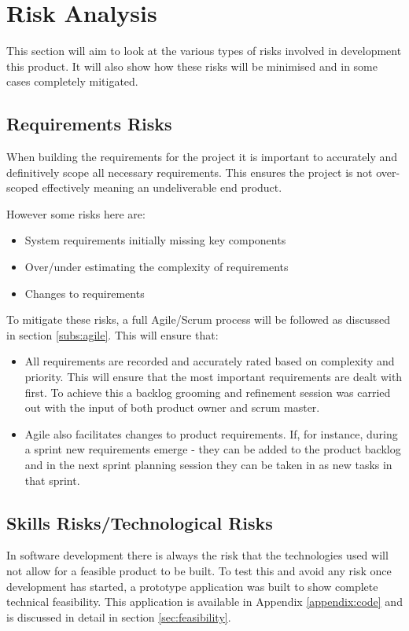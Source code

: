 \section{Risk Analysis}
This section will aim to look at the various types of risks involved in development this product. It will also show how these risks will be minimised and in some cases completely mitigated.

\subsection{Requirements Risks}
When building the requirements for the project it is important to accurately and definitively scope all necessary requirements. This ensures the project is not over-scoped effectively meaning an undeliverable end product.

However some risks here are:

\begin{itemize}
	\item System requirements initially missing key components
	\item Over/under estimating the complexity of requirements
	\item Changes to requirements
\end{itemize}

To mitigate these risks, a full Agile/Scrum process will be followed as discussed in section \ref{subs:agile}. This will ensure that:

\begin{itemize}
	\item All requirements are recorded and accurately rated based on complexity and priority. This will ensure that the most important requirements are dealt with first. To achieve this a backlog grooming and refinement session was carried out with the input of both product owner and scrum master.
	\item Agile also facilitates changes to product requirements. If, for instance, during a sprint new requirements emerge - they can be added to the product backlog and in the next sprint planning session they can be taken in as new tasks in that sprint. 
\end{itemize}

\subsection{Skills Risks/Technological Risks}
In software development there is always the risk that the technologies used will not allow for a feasible product to be built. To test this and avoid any risk once development has started, a prototype application was built to show complete technical feasibility. This application is available in Appendix \ref{appendix:code} and is discussed in detail in section \ref{sec:feasibility}.

